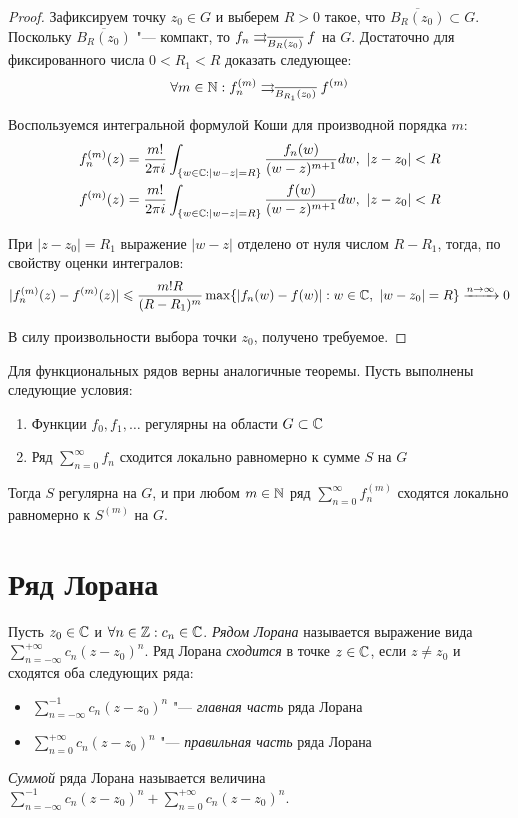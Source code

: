 \begin{proof}
	Зафиксируем точку $z_0 \in G$ и выберем $R > 0$ такое, что $\overline{B_R(z_0)} \subset G$. Поскольку $\overline{B_R(z_0)}$ "--- компакт, то $f_n \rightrightarrows_{\overline{B_R(z_0)}} f$ на $G$. Достаточно для фиксированного числа $0 < R_1 < R$ доказать следующее:
	\[\forall m \in \mathbb{N}: f_n^{(m)} \rightrightarrows_{\overline{B_{R_1}(z_0)}} f^{(m)}\]
	
	Воспользуемся интегральной формулой Коши для производной порядка $m$:
	\begin{gather*}
		f_n^{(m)}(z) = \frac{m!}{2\pi i}\int_{\{w \in \mathbb{C}: |w - z| = R\}}\frac{f_n(w)}{(w - z)^{m+1}}dw,~|z - z_0| < R\\
		f^{(m)}(z) = \frac{m!}{2\pi i}\int_{\{w \in \mathbb{C}: |w - z| = R\}}\frac{f(w)}{(w - z)^{m+1}}dw,~|z - z_0| < R
	\end{gather*}
	
	При $|z - z_0| = R_1$ выражение $|w - z|$ отделено от нуля числом $R - R_1$, тогда, по свойству оценки интегралов:
	\[|f_n^{(m)}(z) - f^{(m)}(z)| \leqslant \frac{m!R}{(R - R_1)^m}\max\{|f_n(w) - f(w)| : w \in \mathbb{C},~|w - z_0| = R\} \xrightarrow{n \to \infty} 0\]
	
	В силу произвольности выбора точки $z_0$, получено требуемое.
\end{proof}

\begin{note}
	Для функциональных рядов верны аналогичные теоремы. Пусть выполнены следующие условия:
	\begin{enumerate}
		\item Функции $f_0, f_1, \dotsc$ регулярны на области $G \subset \mathbb{C}$
		\item Ряд $\sum_{n=0}^\infty f_n$ сходится локально равномерно к сумме $S$ на $G$
	\end{enumerate}
	
	Тогда $S$ регулярна на $G$, и при любом $m \in \mathbb{N}$ ряд $\sum_{n=0}^\infty f_n^{(m)}$ сходятся локально равномерно к $S^{(m)}$ на $G$.
\end{note}

\section{Ряд Лорана}

\begin{definition}
	Пусть $z_0 \in \mathbb{C}$ и $\forall n \in \mathbb{Z}: c_n \in \mathbb{C}$. \textit{Рядом Лорана} называется выражение вида $\sum_{n = -\infty}^{+\infty}c_n(z - z_0)^n$. Ряд Лорана \textit{сходится} в точке $z \in \mathbb{C}$, если $z \ne z_0$ и сходятся оба следующих ряда:
	\begin{itemize}
		\item $\sum_{n = -\infty}^{-1}c_n(z - z_0)^n$ "--- \textit{главная часть} ряда Лорана
		\item $\sum_{n = 0}^{+\infty}c_n(z - z_0)^n$ "--- \textit{правильная часть} ряда Лорана
	\end{itemize}
	
	\textit{Суммой} ряда Лорана называется величина $\sum_{n = -\infty}^{-1}c_n(z - z_0)^n + \sum_{n = 0}^{+\infty}c_n(z - z_0)^n$.
\end{definition}

